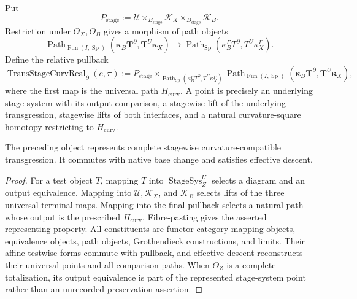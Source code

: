 \begin{definition}
\label{def:prequantum-complete-stagewise-transgression-square}
Put
\[
P_{\mathrm{stage}}
:=
\mathcal U\times_{B_{\mathrm{stage}}}
\mathcal K_X\times_{B_{\mathrm{stage}}}\mathcal K_B.
\]
Restriction under $\Theta_X,\Theta_B$ gives a morphism of path objects
\[
\operatorname{Path}_{\operatorname{Fun}(I,\operatorname{Sp})}
(\mathbf\kappa_B\mathbf T^\partial,
 \mathbf T^U\mathbf\kappa_X)
\longrightarrow
\operatorname{Path}_{\operatorname{Sp}}
(\kappa_B^\Gamma T^\partial,T^U\kappa_X^\Gamma).
\]
Define the relative pullback
\[
\boxed{
\operatorname{TransStageCurvReal}_{\partial}(e,\pi)
:=
P_{\mathrm{stage}}
\times_{
\operatorname{Path}_{\operatorname{Sp}}
(\kappa_B^\Gamma T^\partial,T^U\kappa_X^\Gamma)}
\operatorname{Path}_{\operatorname{Fun}(I,\operatorname{Sp})}
(\mathbf\kappa_B\mathbf T^\partial,
 \mathbf T^U\mathbf\kappa_X),
}
\]
where the first map is the universal path $H_{\mathrm{curv}}$.
A point is precisely an underlying stage system with its output comparison, a
stagewise lift of the underlying transgression, stagewise lifts of both
interfaces, and a natural curvature-square homotopy restricting to
$H_{\mathrm{curv}}$.
\end{definition}

\begin{proposition}
\label{prop:prequantum-stage-realization-universal-property}
The preceding object represents complete stagewise curvature-compatible
transgression.  It commutes with native base change and satisfies effective
descent.
\end{proposition}

\begin{proof}
For a test object $T$, mapping $T$ into $\operatorname{StageSys}_Z^U$ selects a
diagram and an output equivalence.  Mapping into $\mathcal U,\mathcal K_X$, and
$\mathcal K_B$ selects lifts of the three universal terminal maps.  Mapping into
the final pullback selects a natural path whose output is the prescribed
$H_{\mathrm{curv}}$.  Fibre-pasting gives the asserted representing property.
All constituents are functor-category mapping objects, equivalence objects,
path objects, Grothendieck constructions, and limits.  Their affine-testwise
forms commute with pullback, and effective descent reconstructs their universal
points and all comparison paths.  When $\Theta_Z$ is a complete totalization,
its output equivalence is part of the represented stage-system point rather than
an unrecorded preservation assertion.
\end{proof}

